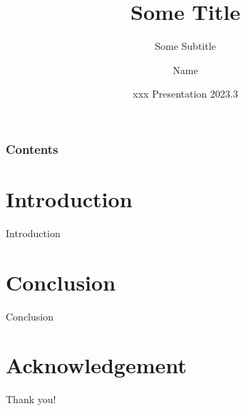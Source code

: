 \documentclass[10pt]{beamer}
\title[The University of Hong Kong]{Some Title
}
\subtitle{Some Subtitle}
\author[abc2-c]{Name}
\institute[xxx@hku.hk]{ The University of Hong Kong}
\date[xxx Presentation 2023.3]
{xxx Presentation 2023.3}
\begin{document}
\frame{\titlepage}
\begin{frame}
\frametitle{Contents}
\tableofcontents
\end{frame}
\section{Introduction}
    \begin{frame}{Introduction}
    \end{frame}


\section{Conclusion}
    \begin{frame}{Conclusion}
    \end{frame}



\section*{Acknowledgement}  
\begin{frame}
\textcolor{myNewColorA}{\Huge{\centerline{Thank you!}}}
\end{frame}
\end{document}
